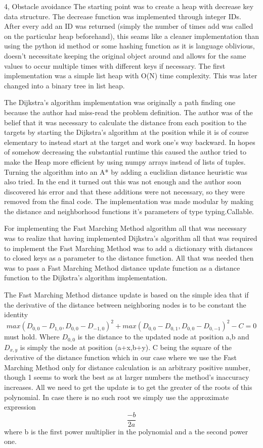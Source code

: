 
\begin{task}{4, Obstacle avoidance}
The starting point was to create a heap with decrease key data structure. The decrease function was implemented through integer IDs. After every add an ID was returned (simply the number of times add was called on the particular heap beforehand), this seams like a cleaner implementation than using the python id method or some hashing function as it is language oblivious, doesn't necessitate keeping the original object around and allows for the same values to occur multiple times with different keys if necessary. The first implementation was a simple list heap with O(N) time complexity. This was later changed into a binary tree in list heap.

The Dijkstra's algorithm implementation was originally a path finding one because the author had miss-read the problem definition. The author was of the belief that it was necessary to calculate the distance from each position to the targets by starting the Dijkstra's algorithm at the position while it is of course elementary to instead start at the target and work one's way backward. In hopes of somehow decreasing the substantial runtime this caused the author tried to make the Heap more efficient by using numpy arrays instead of lists of tuples. Turning the algorithm into an A* by adding a euclidian distance heuristic was also tried. In the end it turned out this was not enough and the author soon discovered his error and that these additions were not necessary, so they were removed from the final code. The implementation was made modular by making the distance and neighborhood functions it's parameters of type typing.Callable.

For implementing the Fast Marching Method algorithm all that was necessary was to realize that having implemented Dijkstra's algorithm all that was required to implement the Fast Marching Method was to add a dictionary with distances to closed keys as a parameter to the distance function. All that was needed then was to pass a Fast Marching Method distance update function as a distance function to the Dijkstra's algorithm implementation.

The Fast Marching Method distance update is based on the simple idea that if the derivative of the distance between neighboring nodes is to be constant the identity
$$max(D_{0,0}-D_{1,0}, D_{0,0}-D_{-1,0})^2 + max(D_{0,0}-D_{0,1}, D_{0,0}-D_{0,-1})^2 - C = 0  $$
must hold. Where $D_{0,0}$ is the distance to the updated node at position a,b and $D_{x,y}$ is simply the node at position (a+x,b+y). C being the square of the derivative of the distance function which in our case where we use the Fast Marching Method only for distance calculation is an arbitrary positive number, though 1 seems to work the best as at larger numbers the method's inaccuracy increases.
All we need to get the update is to get the greater of the roots of this polynomial.
In case there is no such root we simply use the approximate expression
$$\frac{-b}{2a}$$
where b is the first power multiplier in the polynomial and a the second power one.


\end{task}

